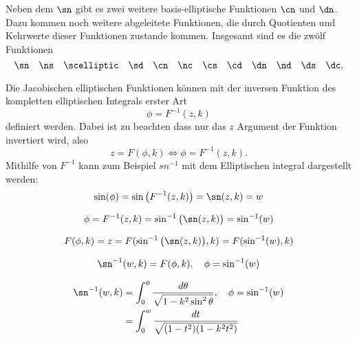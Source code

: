 Neben dem $\sn$ gibt es zwei weitere basis-elliptische Funktionen $\cn$ und $\dn$.
Dazu kommen noch weitere abgeleitete Funktionen, die durch Quotienten und Kehrwerte dieser Funktionen zustande kommen.
Insgesamt sind es die zwölf Funktionen
\begin{equation*}
    \sn \quad
    \ns \quad
    \scelliptic \quad
    \sd \quad
    \cn \quad
    \nc \quad
    \cs \quad
    \cd \quad
    \dn \quad
    \nd \quad
    \ds \quad
    \dc.
\end{equation*}

Die Jacobischen elliptischen Funktionen können mit der inversen Funktion des kompletten elliptischen Integrals erster Art
\begin{equation}
    \phi = F^{-1}(z, k)
\end{equation}
definiert werden. Dabei ist zu beachten dass nur das $z$ Argument der Funktion invertiert wird, also
\begin{equation}
    z = F(\phi, k)
    \Leftrightarrow
    \phi = F^{-1}(z, k).
\end{equation}
Mithilfe von $F^{-1}$ kann zum Beispiel $sn^{-1}$ mit dem Elliptischen integral dargestellt werden:
\begin{equation}
    \sin(\phi)
    =
    \sin \left( F^{-1}(z, k) \right)
    =
    \sn(z, k)
    =
    w
\end{equation}

\begin{equation}
    \phi
    =
     F^{-1}(z, k)
     =
     \sin^{-1} \big( \sn (z, k ) \big)
     =
    \sin^{-1} ( w )
\end{equation}

\begin{equation}
    F(\phi, k)
    =
    z
    =
    F( \sin^{-1} \big( \sn (z, k ) \big) , k)
    =
    F( \sin^{-1} ( w ), k)
\end{equation}

\begin{equation}
    \sn^{-1}(w, k)
    =
    F(\phi, k),
    \quad
    \phi = \sin^{-1}(w)
\end{equation}

\begin{align}
    \sn^{-1}(w, k)
        & =
    \int_{0}^{\phi}
    \frac{
        d\theta
    }{
        \sqrt{
            1-k^2 \sin^2 \theta
        }
    },
    \quad
    \phi = \sin^{-1}(w)
    \\
        & =
    \int_{0}^{w}
    \frac{
        dt
    }{
        \sqrt{
            (1-t^2)(1-k^2 t^2)
        }
    }
\end{align}

